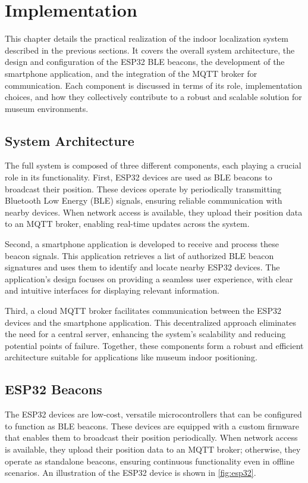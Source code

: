 \chapter{Implementation}
\label{chap:implementation}

This chapter details the practical realization of the indoor localization system described in the previous sections. It covers the overall system architecture, the design and configuration of the ESP32 BLE beacons, the development of the smartphone application, and the integration of the MQTT broker for communication. Each component is discussed in terms of its role, implementation choices, and how they collectively contribute to a robust and scalable solution for museum environments.

\section{System Architecture}
The full system is composed of three different components, each playing a crucial role in its functionality. First, ESP32 devices are used as BLE beacons to broadcast their position. These devices operate by periodically transmitting Bluetooth Low Energy (BLE) signals, ensuring reliable communication with nearby devices. When network access is available, they upload their position data to an MQTT broker, enabling real-time updates across the system.

Second, a smartphone application is developed to receive and process these beacon signals. This application retrieves a list of authorized BLE beacon signatures and uses them to identify and locate nearby ESP32 devices. The application’s design focuses on providing a seamless user experience, with clear and intuitive interfaces for displaying relevant information.

Third, a cloud MQTT broker facilitates communication between the ESP32 devices and the smartphone application. This decentralized approach eliminates the need for a central server, enhancing the system’s scalability and reducing potential points of failure. Together, these components form a robust and efficient architecture suitable for applications like museum indoor positioning.

\section{ESP32 Beacons}
The ESP32 devices are low-cost, versatile microcontrollers that can be configured to function as BLE beacons. These devices are equipped with a custom firmware that enables them to broadcast their position periodically. When network access is available, they upload their position data to an MQTT broker; otherwise, they operate as standalone beacons, ensuring continuous functionality even in offline scenarios. An illustration of the ESP32 device is shown in \autoref{fig:esp32}.

